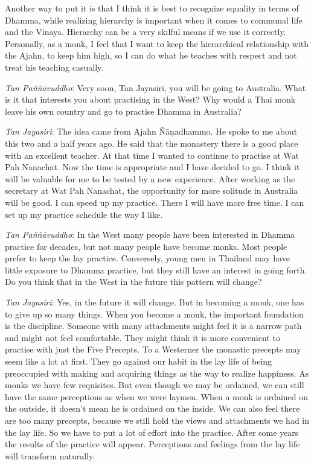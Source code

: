 Another way to put it is that I think it is best
to recognize equality in terms of Dhamma, while realizing hierarchy is
important when it comes to communal life and the Vinaya. Hierarchy can
be a very skilful means if we use it correctly. Personally, as a monk, I
feel that I want to keep the hierarchical relationship with the Ajahn, 
to keep him high, so I can do what he teaches with respect and not treat
his teaching casually. 

\emph{Tan Paññāvuddho}: Very soon, Tan Jayasiri, you will be going to
Australia. What is it that interests you about practising in the West? 
Why would a Thai monk leave his own country and go to practise Dhamma in
Australia? 

\emph{Tan Jayasiri}: The idea came from Ajahn Ñāṇadhammo. He spoke to me
about this two and a half years ago. He said that the monastery there is
a good place with an excellent teacher. At that time I wanted to
continue to practise at Wat Pah Nanachat. Now the time is appropriate
and I have decided to go. I think it will be valuable for me to be
tested by a new experience. After working as the secretary at Wat Pah
Nanachat, the opportunity for more solitude in Australia will be good. I
can speed up my practice. There I will have more free time. I can set up
my practice schedule the way I like. 

\emph{Tan Paññāvuddho}: In the West many people have been interested in
Dhamma practice for decades, but not many people have become monks. Most
people prefer to keep the lay practice. Conversely, young men in
Thailand may have little exposure to Dhamma practice, but they still
have an interest in going forth. Do you think that in the West in the
future this pattern will change? 

\emph{Tan Jayasiri}: Yes, in the future it will change. But in becoming
a monk, one has to give up so many things. When you become a monk, the
important foundation is the discipline. Someone with many attachments
might feel it is a narrow path and might not feel comfortable. They
might think it is more convenient to practise with just the Five
Precepts. To a Westerner the monastic precepts may seem like a lot at
first. They go against our habit in the lay life of being preoccupied
with making and acquiring things as the way to realize happiness. As
monks we have few requisites. But even though we may be ordained, we can
still have the same perceptions as when we were laymen. When a monk is
ordained on the outside, it doesn't mean he is ordained on the inside. 
We can also feel there are too many precepts, because we still hold the
views and attachments we had in the lay life. So we have to put a lot of
effort into the practice. After some years the results of the practice
will appear. Perceptions and feelings from the lay life will transform
naturally. 

